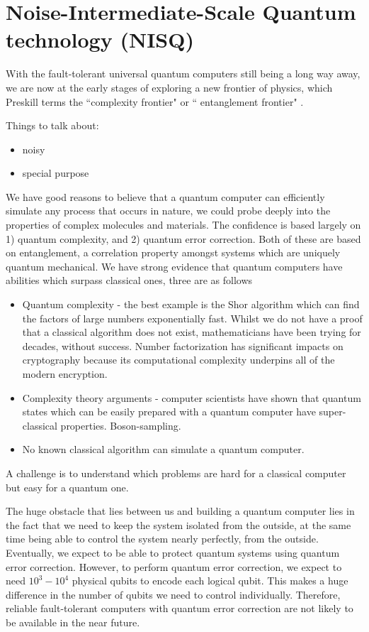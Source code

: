 \section{Noise-Intermediate-Scale Quantum technology (NISQ)}

With the fault-tolerant universal quantum computers still being a long way away, we are now
at the early stages of exploring a new frontier of physics, which Preskill terms the 
``complexity frontier" or `` entanglement frontier" \cite{}.

\color{blue}
Things to talk about:
\begin{itemize}
\item  noisy
\item special purpose
\end{itemize}

\color{black}


We have good reasons to believe that a quantum computer can efficiently simulate any process that occurs in nature, we could probe deeply into the properties of complex molecules and materials. The confidence is based largely on 1) quantum complexity, and 2) quantum error correction. Both of these are based on entanglement, a correlation property amongst systems which are uniquely quantum mechanical.  We have strong evidence that quantum computers have abilities which surpass classical ones, three are as follows
\begin{itemize}
\item Quantum complexity - the best example is the Shor algorithm \cite{} which can find the factors of large numbers exponentially fast. Whilst we do not have a proof that a classical algorithm does not exist, mathematicians have been trying for decades, without success. Number factorization has significant impacts on cryptography because its computational complexity underpins all of the modern encryption. 
% 
\item Complexity theory arguments - computer scientists have shown that quantum states which can be easily prepared with a quantum computer have super-classical properties. Boson-sampling.
% 
\item No known classical algorithm can simulate a quantum computer.
\end{itemize}

A challenge is to understand which problems are hard for a classical computer but easy for a quantum one.


The huge obstacle that lies between us and building a quantum computer lies in the fact that we need to keep the system isolated from the outside, at the same time being able to control the system nearly perfectly, from the outside. Eventually, we expect to be able to protect quantum systems using quantum error correction. However, to perform quantum error correction, we expect to need $10^3 - 10^4$ physical qubits to encode each logical qubit. This makes a huge difference in the number of qubits we need to control individually. Therefore, reliable fault-tolerant computers with quantum error correction are not likely to be available in the near future.




